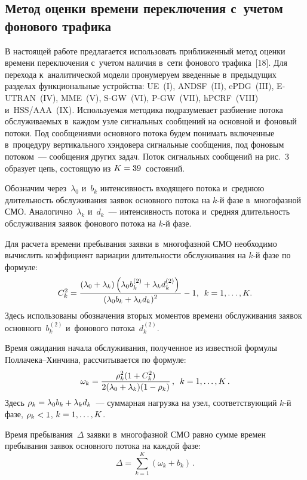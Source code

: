 \begin{multicols}{2}
\section{Метод оценки времени переключения с~учетом фонового 
трафика}

  В настоящей работе предлагается использовать приближенный метод оценки 
времени переключения с~учетом наличия в~сети фонового трафика~[18]. Для 
перехода к~аналитической модели пронумеруем введенные в~предыдущих 
разделах функциональные устройства: UE~(I), ANDSF~(II), ePDG~(III),  
E-UTRAN~(IV), MME~(V), S-GW~(VI), P-GW~(VII), hPCRF~(VIII) 
и~HSS/AAA~(IX). Используемая методика подразумевает разбиение потока 
обслуживаемых в~каждом узле сигнальных сообщений на основной и~фоновый 
потоки. Под сообщениями основного потока будем понимать включенные 
в~процедуру вертикального хэндовера сигнальные сообщения, под фоновым 
потоком~--- сообщения других задач. Поток сигнальных сообщений на рис.~3 
образует цепь, состоящую из $K\hm=39$~со\-сто\-яний. 



  Обозначим через~$\lambda_0$ и~$b_k$ интенсивность входящего потока 
и~среднюю длительность обслу\-жи\-вания заявок основного потока на $k$-й фазе 
в~многофаз\-ной СМО. Аналогично~$\lambda_k$ и~$d_k$~--- интенсивность 
потока и~средняя длительность обслуживания заявок фонового потока на $k$-й 
фазе. 
  
  Для расчета времени пребывания заявки в~многофазной СМО необходимо 
вычислить коэффициент вариации длительности обслуживания на $k$-й фазе 
по формуле:
  \begin{equation*}
  C_k^2 =\displaystyle\frac{\displaystyle (\lambda_0+\lambda_k) \left(\lambda_0 b_k^{(2)} +\lambda_k 
d_k^{(2)}\right)\mathstrut}{\displaystyle (\lambda_0 b_k+\lambda_k d_k)^2\mathstrut}-1,\enskip
  k=1,\ldots, K.
  \end{equation*}
Здесь использованы обозначения вторых моментов времени обслуживания 
заявок основного~$b_k^{(2)}$ и~фонового потока~$d_k^{(2)}$.

  Время ожидания начала обслуживания, полученное из известной формулы 
Пол\-ла\-че\-ка--Хин\-чи\-на, рассчитывается по формуле:
  $$
  \omega_k= \displaystyle\frac{\displaystyle \rho_k^2(1+C_k^2)\mathstrut}{\displaystyle 2(\lambda_0+\lambda_k) (1-
\rho_k)\mathstrut}\,,\enskip k=1,\ldots, K\,.
  $$
Здесь $\rho_k=\lambda_0b_k\hm+\lambda_kd_k$~--- суммарная нагрузка на узел, 
соответствующий $k$-й фазе, $\rho_k\hm< 1$, $k\hm=1,\ldots, K$.

  Время пребывания~$\Delta$ заявки в~многофазной СМО равно сумме времен 
пребывания заявок основного потока на каждой фазе:
  $$
  \Delta= \sum\limits^K_{k=1} \left( \omega_k+b_k\right)\,.
  $$
  

\end{multicols}
